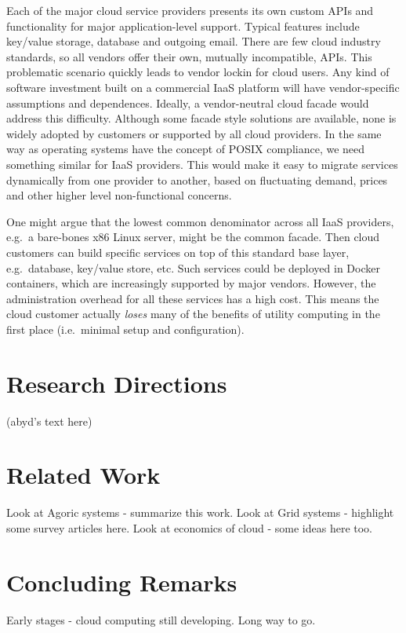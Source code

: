 \documentclass[conference,10pt]{IEEEtran}
\begin{document}
Each of the major cloud service providers presents its own custom APIs and functionality for major application-level support. Typical features include key/value storage, database and outgoing email.
There are few cloud industry standards, so all vendors offer their own, mutually incompatible, APIs.
This problematic scenario quickly leads to vendor lockin for cloud users. Any kind of software investment built on a commercial IaaS platform will have vendor-specific assumptions and dependences. 
Ideally, a vendor-neutral cloud facade would address this difficulty. Although some facade style solutions are available, none is widely adopted by customers or supported by all cloud providers.
In the same way as operating systems have the concept of POSIX compliance, we need something similar for IaaS providers. This would make it easy to migrate services dynamically from one provider to another, based on fluctuating demand, prices and other higher level non-functional concerns.

One might argue that the lowest common denominator across all IaaS providers, e.g.\ a bare-bones x86 Linux server, might be the common facade. Then cloud customers can build specific services on top of this standard base layer, e.g.\ database, key/value store, etc. Such services could be deployed in Docker containers, which are increasingly supported by major vendors. However, the administration overhead for all these services has a high cost.
This means the cloud customer actually \emph{loses} many of the benefits of utility computing in the first place
(i.e.\ minimal setup and configuration).


\section{Research Directions}

(abyd's text here)

\section{Related Work}

Look at Agoric systems - summarize this work.
Look at Grid systems - highlight some survey articles here.
Look at economics of cloud - some ideas here too.

\section{Concluding Remarks}

Early stages - cloud computing still developing. Long way to go.
\end{document}
